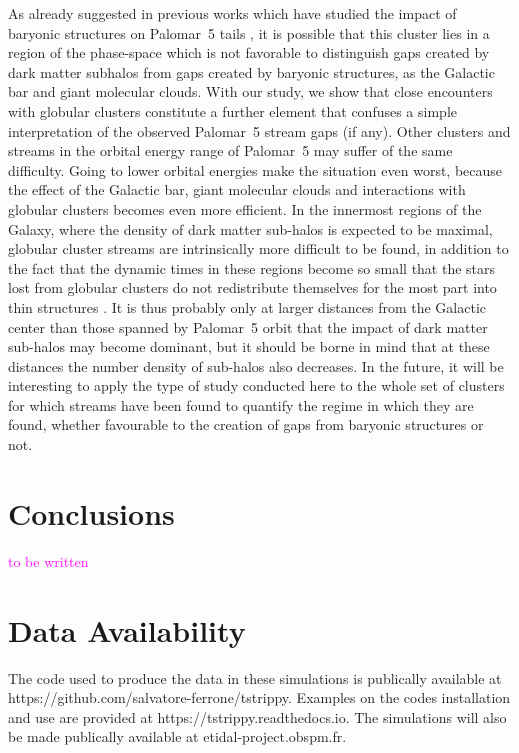 \documentclass[draft]{aa}
\newcommand{\paola}[1]{\textcolor{magenta}{{#1}}}
\begin{document}
  As already suggested in previous works which have studied the impact of baryonic structures on Palomar~5 tails \citep{2017NatAs...1..633P, 2019MNRAS.484.2009B}, it is possible that this cluster lies in a region of the phase-space which is not favorable to distinguish gaps created by dark matter subhalos from gaps created by baryonic structures, as the Galactic bar and giant molecular clouds. With our study, we show that close encounters with globular clusters constitute  a further element that confuses a simple interpretation of the observed Palomar~5 stream gaps (if any). Other clusters and streams in the orbital energy range of Palomar~5 may suffer of the same difficulty. Going to lower orbital energies make the situation even worst, because the effect of the Galactic bar, giant molecular clouds and interactions with globular clusters becomes even more efficient. In the innermost regions of the Galaxy, where the density of dark matter sub-halos is expected to be maximal, globular cluster streams are intrinsically more difficult to be found, in addition to the fact that the dynamic times in these regions become so small that the stars lost from globular clusters do not redistribute themselves for the most part into thin structures \citep[see][]{2023A&A...673A..44F}. It is thus probably only at larger distances from the Galactic center than those spanned by Palomar~5 orbit that the impact of dark matter sub-halos may become dominant, but it should be borne in mind that at these distances the number density of sub-halos also decreases. In the future, it will be interesting to apply the type of study conducted here to the whole set of clusters for which streams have been found to quantify the regime in which they are found, whether favourable to the creation of gaps from baryonic structures or not.
  
  
\section{Conclusions}
  \paola{to be written}
  
  \section*{Data Availability}

  The code used to produce the data in these simulations is publically available at https://github.com/salvatore-ferrone/tstrippy. Examples on the codes installation and use are provided at https://tstrippy.readthedocs.io. The simulations will also be made publically available at etidal-project.obspm.fr.
\end{document}
